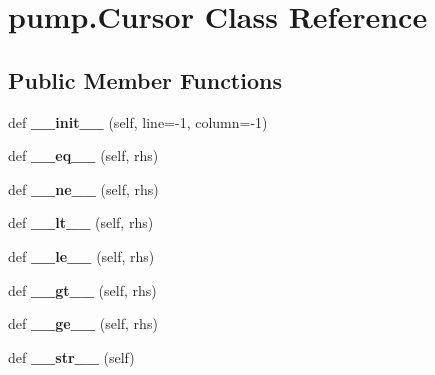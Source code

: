 \hypertarget{classpump_1_1Cursor}{}\section{pump.\+Cursor Class Reference}
\label{classpump_1_1Cursor}
\subsection*{Public Member Functions}
\begin{DoxyCompactItemize}
\item 
def {\bfseries \+\_\+\+\_\+init\+\_\+\+\_\+} (self, line=-\/1, column=-\/1)\hypertarget{classpump_1_1Cursor_a17126ae70ca573c43e4d38b1ccd03015}{}\label{classpump_1_1Cursor_a17126ae70ca573c43e4d38b1ccd03015}

\item 
def {\bfseries \+\_\+\+\_\+eq\+\_\+\+\_\+} (self, rhs)\hypertarget{classpump_1_1Cursor_ab430cfd4cfd2fa2b57ea31b128e56f22}{}\label{classpump_1_1Cursor_ab430cfd4cfd2fa2b57ea31b128e56f22}

\item 
def {\bfseries \+\_\+\+\_\+ne\+\_\+\+\_\+} (self, rhs)\hypertarget{classpump_1_1Cursor_a7bcfe24fa4e5df6ed12f627b8d3b3ba3}{}\label{classpump_1_1Cursor_a7bcfe24fa4e5df6ed12f627b8d3b3ba3}

\item 
def {\bfseries \+\_\+\+\_\+lt\+\_\+\+\_\+} (self, rhs)\hypertarget{classpump_1_1Cursor_a4f846e3cf80aa45853b1fb7a03863745}{}\label{classpump_1_1Cursor_a4f846e3cf80aa45853b1fb7a03863745}

\item 
def {\bfseries \+\_\+\+\_\+le\+\_\+\+\_\+} (self, rhs)\hypertarget{classpump_1_1Cursor_a7652488b46ecf1dfa4d0a83bff9411ab}{}\label{classpump_1_1Cursor_a7652488b46ecf1dfa4d0a83bff9411ab}

\item 
def {\bfseries \+\_\+\+\_\+gt\+\_\+\+\_\+} (self, rhs)\hypertarget{classpump_1_1Cursor_aa6109b9e7048e6260c2018a6d8878739}{}\label{classpump_1_1Cursor_aa6109b9e7048e6260c2018a6d8878739}

\item 
def {\bfseries \+\_\+\+\_\+ge\+\_\+\+\_\+} (self, rhs)\hypertarget{classpump_1_1Cursor_aeadc1924f4435a1a67fada88b0bce40a}{}\label{classpump_1_1Cursor_aeadc1924f4435a1a67fada88b0bce40a}

\item 
def {\bfseries \+\_\+\+\_\+str\+\_\+\+\_\+} (self)\hypertarget{classpump_1_1Cursor_ada8d922763be27a0b1745e94748de2c3}{}\label{classpump_1_1Cursor_ada8d922763be27a0b1745e94748de2c3}


\end{DoxyCompactItemize}
